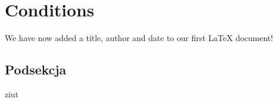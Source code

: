 \section{Conditions}
\label{sec:conditions}
We have now added a title, author and date to our first \LaTeX{} document!
\subsection{Podsekcja}
ziut